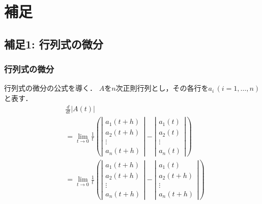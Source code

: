 \documentclass[10pt,hyperref={unicode}]{beamer}
\newcommand{\absolute}[1]{\left|#1\right|}
\newcommand{\parentheses}[1]{\left(#1\right)}
\begin{document}
\section{補足}
\subsection{補足1: 行列式の微分}
\label{sec:det}
\begin{frame}
\frametitle{行列式の微分}
行列式の微分の公式を導く．
$A$を$n$次正則行列とし，その各行を$a_i\,\parentheses{i = 1,\ldots,n}$と表す．
\begin{align*}
    &\frac{d}{dt}\absolute{A\parentheses{t}} \\
    &= \lim_{t \to 0}\frac{1}{t}\parentheses{%
        \absolute{%
            \begin{array}{c}
                a_1\parentheses{t + h} \\
                a_2\parentheses{t + h} \\
                \vdots \\
                a_n\parentheses{t + h}
            \end{array}
        }
        -
        \absolute{%
            \begin{array}{c}
                a_1\parentheses{t} \\
                a_2\parentheses{t} \\
                \vdots \\
                a_n\parentheses{t}
            \end{array}
        }
    } \\
    &= \lim_{t \to 0}\frac{1}{t}\parentheses{%
        \absolute{%
            \begin{array}{c}
                a_1\parentheses{t + h} \\
                a_2\parentheses{t + h} \\
                \vdots \\
                a_n\parentheses{t + h}
            \end{array}
        }
        -
        \absolute{%
            \begin{array}{c}
                a_1\parentheses{t} \\
                a_2\parentheses{t + h} \\
                \vdots \\
                a_n\parentheses{t + h}
            \end{array}
}}
\end{align*}
\end{frame}
\end{document}
